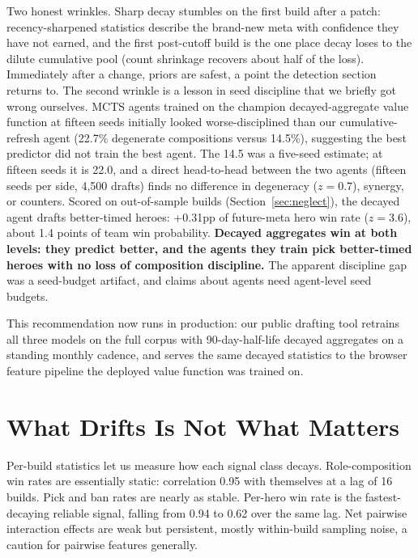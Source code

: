 \documentclass[journal]{IEEEtran}
\begin{document}
Two honest wrinkles. Sharp decay stumbles on the first build after a
patch: recency-sharpened statistics describe the brand-new meta with
confidence they have not earned, and the first post-cutoff build is the
one place decay loses to the dilute cumulative pool (count shrinkage
recovers about half of the loss). Immediately after a change, priors are
safest, a point the detection section returns to. The second wrinkle is
a lesson in seed discipline that we briefly got wrong ourselves. MCTS
agents trained on the champion decayed-aggregate value function at
fifteen seeds initially looked worse-disciplined than our
cumulative-refresh agent (22.7\% degenerate compositions versus 14.5\%),
suggesting the best predictor did not train the best agent. The 14.5 was
a five-seed estimate; at fifteen seeds it is 22.0, and a direct
head-to-head between the two agents (fifteen seeds per side, 4{,}500
drafts) finds no difference in degeneracy ($z = 0.7$), synergy, or
counters. Scored on out-of-sample builds (Section~\ref{sec:neglect}),
the decayed agent drafts better-timed heroes: +0.31pp of future-meta
hero win rate ($z = 3.6$), about 1.4 points of team win probability.
\textbf{Decayed aggregates win at both levels: they predict better, and
the agents they train pick better-timed heroes with no loss of
composition discipline.} The apparent discipline gap was a seed-budget
artifact, and claims about agents need agent-level seed budgets.

This recommendation now runs in production: our public drafting tool
retrains all three models on the full corpus with 90-day-half-life
decayed aggregates on a standing monthly cadence, and serves the same
decayed statistics to the browser feature pipeline the deployed value
function was trained on.

\section{What Drifts Is Not What Matters}
\label{sec:signals}

Per-build statistics let us measure how each signal class decays.
Role-composition win rates are essentially static: correlation 0.95 with
themselves at a lag of 16 builds. Pick and ban rates are nearly as
stable. Per-hero win rate is the fastest-decaying reliable signal,
falling from 0.94 to 0.62 over the same lag. Net pairwise interaction
effects are weak but persistent, mostly within-build sampling noise, a
caution for pairwise features generally.
\end{document}
